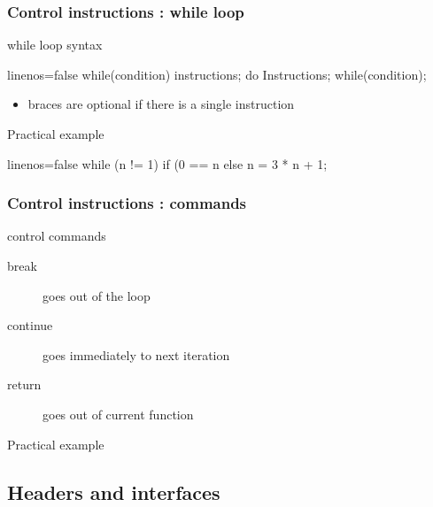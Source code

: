 \begin{frame}[fragile]
  \frametitle{Control instructions : while loop}
  \begin{block}{while loop syntax}
    \begin{cppcode*}{linenos=false}
      while(condition) {
        instructions;
      }
      do {
        Instructions;
      } while(condition);
    \end{cppcode*}
    \vspace{-0.3cm}
    \begin{itemize}
      \item braces are optional if there is a single instruction
    \end{itemize}
  \end{block}
  \pause
  \begin{exampleblock}{Practical example}
    \begin{cppcode*}{linenos=false}
      while (n != 1)
        if (0 == n%
        else n = 3 * n + 1;
    \end{cppcode*}
  \end{exampleblock}
\end{frame}

\begin{frame}[fragile]
  \frametitle{Control instructions : commands}
  \begin{block}{control commands}
    \begin{description}
    \item[break] goes out of the loop
    \item[continue] goes immediately to next iteration
    \item[return] goes out of current function
    \end{description}
  \end{block}
  \pause
  \begin{exampleblock}{Practical example}
  \end{exampleblock}
\end{frame}

\subsection[Headers]{Headers and interfaces}

